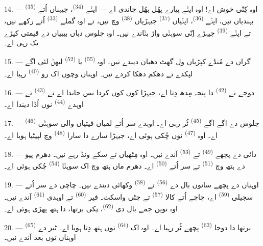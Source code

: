 14. --- اوہ کِنّی خوش اے! اوہ اپݨے پیارے پھُل بھُل جاندی اے — اپݨے
 \textsuperscript{(34)}، جیہناں اُتے 
\textsuperscript{(35)} بہندیاں نیں، اپݨے  \textsuperscript{(36)}،
اپݨیاں  \textsuperscript{(37)} جیہڑیاں 
\textsuperscript{(38)} وچ نیں، تے اوہ گملے  \textsuperscript{(33)} اُتے
رکھے نیں، تے اپݨے  \textsuperscript{(39)} جیہڑے اِنّی سوہݨی واڑ
بݨاندے نیں۔ اوہ جلوس دیاں بیبیاں دے قیمتی کپڑے تک رہی اے۔

15. --- گراں دے مُنڈے کپڑیاں ول گھٹ دھیان دیندے نیں۔ اوہ 
\textsuperscript{(55)} یا  \textsuperscript{(52)} لبھݨ لئی اگے لپکدے تے
دھکم دھکا کردے نیں۔ اوہناں وچوں اک رو \textsuperscript{(40)} رہیا اے۔

16. --- دوجے نے  \textsuperscript{(42)} دا پنجہ مِدھ دِتا اے، جیہڑا
کوں کوں کردا نس جاندا اے تے  \textsuperscript{(43)} تے اوہدے
 \textsuperscript{(44)} نوں اُڈا دیندا اے۔

\VUsaut{5.0mm}
\VUsaut{4.0mm}

17. --- جلوس دے اگے اگے  \textsuperscript{(45)} ٹُر رہی اے۔ اوہدے سر
اُتے لمیاں فیتیاں والی سوہݨی  \textsuperscript{(46)} اے۔ اوہ
 \textsuperscript{(47)} نوں چُکی ہوئی اے، جیہڑا سارے دا سارا
 \textsuperscript{(48)} وچ لپیٹیا ہویا اے۔

18. --- دائی دے پچھے  \textsuperscript{(49)} تے
 \textsuperscript{(53)} آندے نیں۔ اوہ مِٹھیاں تے سکے ونڈ رہے نیں۔
دھرم پیو دے ہتھ وچ  \textsuperscript{(51)} تے سر اُتے
 \textsuperscript{(50)} اے۔ دھرم ماں ہتھ وچ اک سوہݨا
 \textsuperscript{(54)} چُکی ہوئی اے۔

19. --- اوہناں دے پچھے سانوں بال دے  \textsuperscript{(56)} تے
 \textsuperscript{(58)} وکھائی دیندے نیں۔ چاچی دے سر اُتے سجیلی
 \textsuperscript{(59)} اے، چاچے اُتے کالا 
\textsuperscript{(57)} تے چٹی واسکٹ۔ فیر  \textsuperscript{(60)}
تے اوہدی  \textsuperscript{(61)} آندے نیں۔ اوہ نویں جمے بال دی
 \textsuperscript{(62)}، نِکی برتھا، دا ہتھ پھڑی ہوئی اے۔

20. --- برتھا دا دوجا  \textsuperscript{(63)} پچھے ٹُر رہیا اے۔ اوہ
اک  \textsuperscript{(64)} نوں ہتھ دِتا ہویا اے۔ ٹبر دے
 \textsuperscript{(65)} اوہناں توں بعد آندے نیں۔

